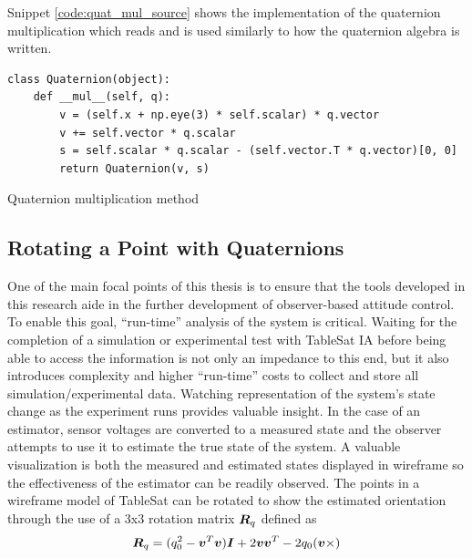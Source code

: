 Snippet \ref{code:quat_mul_source} shows the implementation of the quaternion multiplication which reads and is used similarly to how the quaternion algebra is written.

\begin{listing}
\begin{singlespace}
  \begin{verbatim}
class Quaternion(object):
    def __mul__(self, q):
        v = (self.x + np.eye(3) * self.scalar) * q.vector
        v += self.vector * q.scalar
        s = self.scalar * q.scalar - (self.vector.T * q.vector)[0, 0]
        return Quaternion(v, s)
  \end{verbatim}
\caption{Quaternion multiplication method}
\label{code:quat_mul_source}
\nocite{minted}
\end{singlespace}
\end{listing}


\subsection{Rotating a Point with Quaternions}
\label{subsubsec:RotatingaPointwithQuaternions}

One of the main focal points of this thesis is to ensure that the tools developed in this research aide in the further development of observer-based attitude control.  To enable this goal, ``run-time'' analysis of the system is critical.  Waiting for the completion of a simulation or experimental test with TableSat IA before being able to access the information is not only an impedance to this end, but it also introduces complexity and higher ``run-time'' costs to collect and store all simulation/experimental data.  Watching representation of the system's state change as the experiment runs provides valuable insight.  In the case of an estimator, sensor voltages are converted to a measured state and the observer attempts to use it to estimate the true state of the system.  A valuable visualization is both the measured and estimated states displayed in wireframe so the effectiveness of the estimator can be readily observed.  The points in a wireframe model of TableSat can be rotated to show the estimated orientation through the use of a 3x3 rotation matrix $\boldsymbol{R}_q$ defined as
\begin{equation}
  \boldsymbol{R}_q = (q_0^2 - \boldsymbol{v}^T \boldsymbol{v}) \boldsymbol{I} + 2 \boldsymbol{v} \boldsymbol{v}^T - 2 q_0 (\boldsymbol{v} \times)
  \label{eqn:RotationMatrix}
\end{equation}

